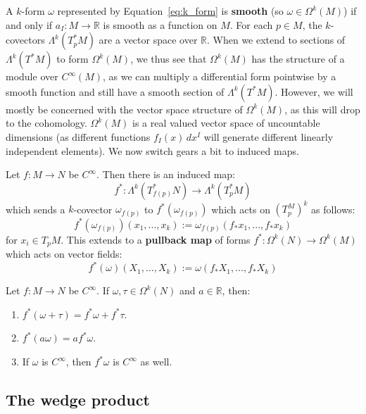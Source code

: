 A $k$-form $\omega$ represented by Equation~\ref{eq:k_form} is \textbf{smooth} (so $\omega\in\Omega^k(M)$) if and only if 
$a_I : M\rightarrow\mathbb R$ is smooth as a function on $M$. For each $p\in M$, the $k$-covectors $\Lambda^k(T_p^* M)$ 
are a vector space over $\mathbb R$. When we extend to sections of $\Lambda^k(T^* M)$ to form $\Omega^k(M)$, we 
thus see that $\Omega^k(M)$ has the structure of a module over $C^\infty(M)$, as we can multiply a differential 
form pointwise by a smooth function and still have a smooth section of $\Lambda^k(T^* M)$. However, we will mostly 
be concerned with the vector space structure of $\Omega^k(M)$, as this will drop to the cohomology. $\Omega^k(M)$ is a 
real valued vector space of uncountable dimensions (as different functions $f_I(x)\,dx^I$ will generate different linearly 
independent elements). We now switch gears a bit to induced maps.
\begin{definition}[Pullback]
	Let $f : M\rightarrow N$ be $C^\infty$. Then there is an induced map:
	\begin{equation}
		f^* : \Lambda^k\left(T_{f(p)}^* N\right)\rightarrow\Lambda^k\left(T_p^* M\right)
	\end{equation}
	which sends a $k$-covector $\omega_{f(p)}$ to $f^*(\omega_{f(p)})$ which acts on $\left(T_p^M\right)^k$ as follows:
	\begin{equation}
		f^*(\omega_{f(p)})(x_1, ..., x_k) := \omega_{f(p)}(f_* x_1, ..., f_* x_k)
	\end{equation}
	for $x_i\in T_p M$. This extends to a \textbf{pullback map} of forms $f^* : \Omega^k(N)\rightarrow\Omega^k(M)$ which 
	acts on vector fields:
	\begin{equation}
		f^*(\omega)(X_1, ..., X_k) := \omega(f_* X_1, ..., f_* X_k)
	\end{equation}
\end{definition}
\begin{lemma}
	Let $f : M\rightarrow N$ be $C^\infty$. If $\omega, \tau\in\Omega^k(N)$ and $a\in\mathbb R$, then:
	\begin{enumerate}
		\item $f^*(\omega + \tau) = f^*\omega + f^*\tau$. 
		\item $f^*(a\omega) = af^*\omega$. 
		\item If $\omega$ is $C^\infty$, then $f^*\omega$ is $C^\infty$ as well. 
	\end{enumerate}
\end{lemma}

\subsection{The wedge product}

